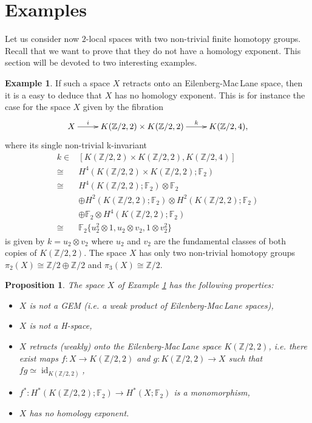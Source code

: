 \documentclass{amsart}
\newtheorem{prop}[thm]{Proposition}
\theoremstyle{definition}
\newtheorem{exmp}[thm]{Example}
\theoremstyle{remark}
\DeclareMathOperator{\id}{id}
\newcommand{\Z}{\mathbb{Z}}
\newcommand{\F}{\mathbb{F}}
\begin{document}
\section{Examples}\label{s:examples}

Let us consider now $2$-local spaces with two non-trivial finite homotopy groups. Recall that we want to prove that they do not have a homology exponent. This section will be devoted to two interesting examples. 

\begin{exmp}\label{e:retract}
If such a space $X$ retracts onto an Eilenberg-Mac\,Lane space, then it is a easy to deduce that $X$ has no homology exponent. This is for instance the case for the space $X$ given by the fibration
$$\xymatrix{
X\ar[r]^-i &K(\Z/2,2)\times K(\Z/2,2)\ar[r]^-k &K(\Z/2,4),
}$$
where its single non-trivial k-invariant
\begin{align*}
k \in& [K(\Z/2,2)\times K(\Z/2,2),K(\Z/2,4)]\\
\cong &H^4(K(\Z/2,2)\times K(\Z/2,2);\F_2)\\
\cong &H^4(K(\Z/2,2);\F_2)\otimes\F_2\\
&\oplus H^2(K(\Z/2,2);\F_2)\otimes H^2(K(\Z/2,2);\F_2)\\
&\oplus\F_2\otimes H^4(K(\Z/2,2);\F_2)\\
\cong &\F_2\{u_2^2\otimes1,u_2\otimes v_2,1\otimes v_2^2\}
\end{align*}
is given by $k=u_2\otimes v_2$ where $u_2$ and $v_2$ are the fundamental classes of both copies of $K(\Z/2,2)$. The space $X$ has only two non-trivial homotopy groups $\pi_2(X)\cong\Z/2\oplus\Z/2$ and $\pi_3(X)\cong\Z/2$.

\begin{prop}\label{p:retract}
The space $X$ of Example \ref{e:retract} has the following properties:
\begin{itemize}
\item[1.]{$X$ is not a GEM (i.e. a weak product of Eilenberg-Mac\,Lane spaces),}
\item[2.]{$X$ is not a H-space,}
\item[3.]{$X$ retracts (weakly) onto the Eilenberg-Mac\,Lane space $K(\Z/2,2)$, i.e. there exist maps $f:X\to K(\Z/2,2)$ and $g:K(\Z/2,2)\to X$ such that $fg\simeq\id_{K(\Z/2,2)}$,}
\item[4.]{$f^*:H^*(K(\Z/2,2);\F_2)\to H^*(X;\F_2)$ is a monomorphism,}
\item[5.]{$X$ has no homology exponent.}
\end{itemize}
\end{prop}


\end{exmp}
\end{document}
